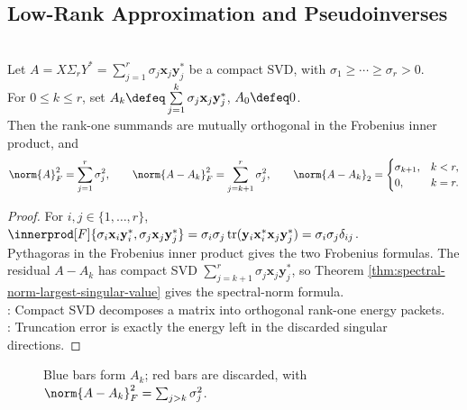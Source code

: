 \subsection{Low-Rank Approximation and Pseudoinverses}

\begin{proposition} \label{prop:rank-one-svd-orthogonality-and-truncation-error} \\
Let $A=X\Sigma_rY^*=\sum_{j=1}^{r}\sigma_j\mathbf{x}_j\mathbf{y}_j^*$ be a compact SVD, with $\sigma_1\geq\cdots\geq\sigma_r>0$.\\
For $0\leq k\leq r$, set $A_k\defeq\sum\limits_{j=1}^{k}\sigma_j\mathbf{x}_j\mathbf{y}_j^*$, $A_0\defeq0$.\\
Then the rank-one summands are mutually orthogonal in the Frobenius inner product, and
\begin{align}
\norm{A}_F^2=\sum_{j=1}^{r}\sigma_j^2,
\qquad
\norm{A-A_k}_F^2=\sum_{j=k+1}^{r}\sigma_j^2,
\qquad
\norm{A-A_k}_2=
\begin{cases}
\sigma_{k+1},&k<r,\\
0,&k=r.
\end{cases}
\nonumber
\end{align}
\begin{proof}
For $i,j\in\{1,\ldots,r\}$, $\innerprod[F]{\sigma_i\mathbf{x}_i\mathbf{y}_i^*,\sigma_j\mathbf{x}_j\mathbf{y}_j^*} =\sigma_i\sigma_j\operatorname{tr}(\mathbf{y}_i\mathbf{x}_i^*\mathbf{x}_j\mathbf{y}_j^*) =\sigma_i\sigma_j\delta_{ij}$.\\
Pythagoras in the Frobenius inner product gives the two Frobenius formulas. The residual $A-A_k$ has compact SVD $\sum_{j=k+1}^{r}\sigma_j\mathbf{x}_j\mathbf{y}_j^*$, so Theorem \ref{thm:spectral-norm-largest-singular-value} gives the spectral-norm formula.\\
: Compact SVD decomposes a matrix into orthogonal rank-one energy packets.\\
: Truncation error is exactly the energy left in the discarded singular directions.
\end{proof}
\end{proposition}

\begin{figure}[H]
  \centering
  
  \caption{Blue bars form $A_k$; red bars are discarded, with $\norm{A-A_k}_F^2=\sum_{j>k}\sigma_j^2$.}
  \label{fig:truncated-svd-energy}
\end{figure}

